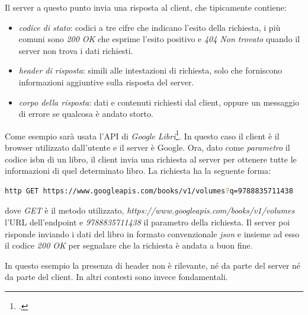 \documentclass[./main.tex]{subfiles}
\begin{document}
Il server a questo punto invia una risposta al client, che tipicamente contiene:

\begin{itemize}
    \item \textit{codice di stato}: codici a tre cifre che indicano l'esito della richiesta, i più comuni sono \textit{200 OK} che esprime l'esito positivo e \textit{404 Non trovato} quando il server non trova i dati richiesti.
    \item \textit{header di risposta}: simili alle intestazioni di richiesta, solo che forniscono informazioni aggiuntive sulla risposta del server.
    \item \textit{corpo della risposta}: dati e contenuti richiesti dal client, oppure un messaggio di errore se qualcosa è andato storto.
\end{itemize}

Come esempio sarà usata l'API di \textit{Google Libri}\footcite[\url{https://developers.google.com/books}]{website-google-books-api}. In questo caso il client è il browser utilizzato dall'utente e il server è Google. Ora, dato come \textit{parametro} il codice isbn di un libro, il client invia una richiesta al server per ottenere tutte le informazioni di quel determinato libro. La richiesta ha la seguente forma:

\begin{lstlisting}[language=bash, caption=richiesta del client]
http GET https://www.googleapis.com/books/v1/volumes?q=9788835711438
\end{lstlisting}

dove \textit{GET} è il metodo utilizzato, \textit{https://www.googleapis.com/books/v1/volumes} l'URL dell'endpoint e \textit{9788835711438} il parametro della richiesta. Il server poi risponde inviando i dati del libro in formato convenzionale \textit{json} e insieme ad esso il codice \textit{200 OK} per segnalare che la richiesta è andata a buon fine.

In questo esempio la presenza di header non è rilevante, né da parte del server né da parte del client. In altri contesti sono invece fondamentali.
\end{document}

